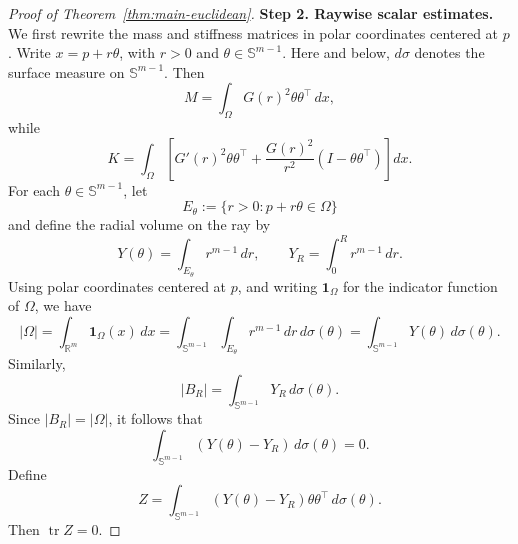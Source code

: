 \documentclass[11pt,letterpaper,reqno]{amsart}
\theoremstyle{definition}
\DeclareMathOperator{\tr}{tr}
\newcommand{\R}{\mathbb R}
\newcommand{\Sph}{\mathbb S}
\begin{document}
\begin{proof}[Proof of Theorem~\ref{thm:main-euclidean}]
\medskip
\noindent\textbf{Step 2. Raywise scalar estimates.}
We first rewrite the mass and stiffness matrices in polar coordinates
centered at \(p\). Write \(x=p+r\theta\), with
\(r>0\) and \(\theta\in\Sph^{m-1}\). Here and below, \(d\sigma\) denotes the surface measure on \(\Sph^{m-1}\). Then
\begin{equation}\label{eq:euclidean-M}
        M=\int_\Omega G(r)^2\theta\theta^\top \,dx,
\end{equation}
while
\begin{equation}\label{eq:euclidean-K}
        K=\int_\Omega
        \left[
        G'(r)^2\theta\theta^\top 
        +\frac{G(r)^2}{r^2}(I-\theta\theta^\top )
        \right]dx.
\end{equation}
For each \(\theta\in\Sph^{m-1}\), let
\[
        E_\theta:=\{r>0:p+r\theta\in\Omega\}
\]
and define the radial volume on the ray by
\[
        Y(\theta)=\int_{E_\theta}r^{m-1}\,dr,
        \qquad
        Y_R=\int_0^Rr^{m-1}\,dr.
\]
Using polar coordinates centered at \(p\), and writing
\(\mathbf 1_\Omega\) for the indicator function of \(\Omega\), we have
\[
        |\Omega|
        =\int_{\R^m}\mathbf 1_\Omega(x)\,dx
        =\int_{\Sph^{m-1}}\int_{E_\theta}r^{m-1}\,dr\,d\sigma(\theta) 
        =\int_{\Sph^{m-1}}Y(\theta)\,d\sigma(\theta).
\]
Similarly,
\[
        |B_R|
        =
        \int_{\Sph^{m-1}}Y_R\,d\sigma(\theta).
\]
Since \(|B_R|=|\Omega|\), it follows that
\begin{equation}\label{eq:euclidean-Y-zero}
        \int_{\Sph^{m-1}}(Y(\theta)-Y_R)\,d\sigma(\theta)=0.
\end{equation}
Define
\[
        Z=\int_{\Sph^{m-1}}(Y(\theta)-Y_R)\theta\theta^\top \,d\sigma(\theta).
\]
Then \(\tr Z=0\).


\end{proof}
\end{document}
